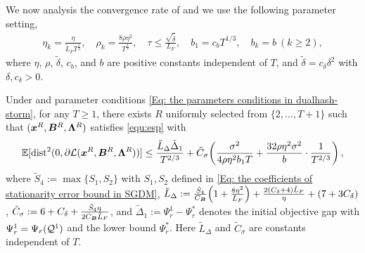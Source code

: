We now analysis the convergence rate of  and we use the following parameter setting,
\begin{align}
\label{Eq: the parameters conditions in dualhash-storm}
    \eta_k = \frac{\eta}{\tilde{L}_{F} T^{\frac{1}{3}}}, \quad 
    \rho_k = \frac{8\rho\eta^2}{T^{\frac{2}{3}}}, \quad 
    \tau \leq \frac{\sqrt{\tilde{\delta}}}{L_F}, \quad 
    b_1 = c_b T^{1/3}, \quad b_k = b \ (k \ge 2),
\end{align}where $\eta$, $\rho$, $\tilde{\delta}$, $c_b$, and $b$ are positive constants
independent of $T$, and $\tilde{\delta}= c_{\delta}\delta^{2}$ with $\delta, c_{\delta}> 0$.
\begin{lemma}
    \label{Lemma: convergence rate of storm} Under  and parameter conditions \eqref{Eq: the parameters conditions in dualhash-storm}, for any $T \geq 1$, there exists $R$ uniformly selected from $\{2,\ldots,T+1\}$ such that $(\bm{x}^{R}, \bm{B}^{R}, \bm{\Lambda}^{R})$ satisfies \eqref{equ:esp} with
    \begin{align}
        \label{Eq: the convergence rate of storm}\mathbb{E}[\mathrm{dist}^{2}(0, \partial \mathcal{L}(\bm{x}^{R}, \bm{B}^{R}, \bm{\Lambda}^{R}))] \leq \frac{\tilde{L}_{\Delta}\tilde{\Delta}_{1}}{T^{2/3}} + \tilde{C}_{\sigma}\!\left(\frac{\sigma^{2}}{4\rho\eta^{2}b_{1}T} + \frac{32\rho\eta^{2}\sigma^{2}}{b}\cdot\frac{1}{T^{2/3}}\right),
    \end{align}where $\tilde{S}_{4}:=\max\{S_{1},S_{2}\}$ with $S_{1},S_{2}$ 
defined in \eqref{Eq: the coefficients of stationarity error bound 
in SGDM}, $\tilde{L}_{\Delta}:=\frac{\tilde{S}_{4}}{C_{\bm{B}}}
\!\left(1+\frac{8\eta^{2}}{\tilde{L}_{F}}\right)+\frac{2(C_{\delta}
+4)\tilde{L}_{F}}{\eta}+(7+3C_{\delta})$, $\tilde{C}_{\sigma}:=
6+C_{\delta}+\frac{\tilde{S}_{4}\eta}{2C_{\bm{B}}\tilde{L}_{F}}$, 
and $\tilde{\Delta}_{1}:= \Psi_r^{1}- \Psi_r^{*}$ denotes the initial objective gap with $\Psi_r^{1}= \Psi_r(\mathcal{Q}^{1})$ and the lower bound $\Psi_r^{*}$. Here $\tilde{L}_{\Delta}$ and $\tilde{C}_{\sigma}$ are constants independent of $T$.
\end{lemma}
